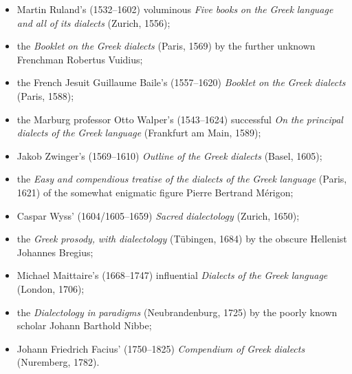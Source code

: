 \begin{itemize}
\item 
Martin Ruland’s (1532–1602) voluminous \textit{Five} \textit{books} \textit{on} \textit{the} \textit{Greek} \textit{language} \textit{and} \textit{all} \textit{of} \textit{its} \textit{dialects} (Zurich, 1556);

\item 
the \textit{Booklet} \textit{on} \textit{the} \textit{Greek} \textit{dialects} (Paris, 1569) by the further unknown Frenchman Robertus Vuidius;

\item 
the French Jesuit Guillaume Baile’s (1557–1620) \textit{Booklet} \textit{on} \textit{the} \textit{Greek} \textit{dialects} (Paris, 1588);

\item 
the Marburg professor Otto Walper’s (1543–1624) successful \textit{On} \textit{the} \textit{principal} \textit{dialects} \textit{of} \textit{the} \textit{Greek} \textit{language} (Frankfurt am Main, 1589);

\item 
Jakob Zwinger’s (1569–1610) \textit{Outline} \textit{of} \textit{the} \textit{Greek} \textit{dialects} (Basel, 1605);

\item 
the \textit{Easy} \textit{and} \textit{compendious} \textit{treatise} \textit{of} \textit{the} \textit{dialects} \textit{of} \textit{the} \textit{Greek} \textit{language} (Paris, 1621) of the somewhat enigmatic figure Pierre Bertrand Mérigon;

\item 
Caspar Wyss’ (1604/1605–1659) \textit{Sacred} \textit{dialectology} (Zurich, 1650);

\item 
the \textit{Greek} \textit{prosody,} \textit{with} \textit{dialectology} (Tübingen, 1684) by the obscure Hellenist Johannes Bregius;

\item 
Michael Maittaire’s (1668–1747) influential \textit{Dialects} \textit{of} \textit{the} \textit{Greek} \textit{language} (London, 1706);

\item 
the \textit{Dialectology} \textit{in} \textit{paradigms} (Neubrandenburg, 1725) by the poorly known scholar Johann Barthold Nibbe;

\item 
Johann Friedrich Facius’ (1750–1825) \textit{Compendium} \textit{of} \textit{Greek} \textit{dialects} (Nuremberg, 1782).

\end{itemize}

